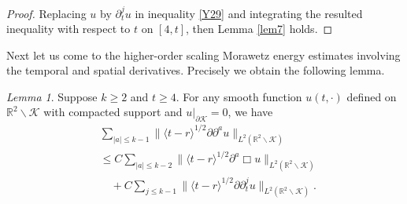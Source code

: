 \documentclass[11pt, reqno]{amsart}
\theoremstyle{definition}
\theoremstyle{remark}
\newtheorem{lem}[thm]{Lemma}
\theoremstyle{definition}
\numberwithin{equation}{section}
\numberwithin{equation}{section}
\def\leq{\leqslant}
\def\geq{\geqslant}
\begin{document}
\begin{proof}
Replacing $u$ by $\partial_t^ju$ in inequality \eqref{Y29} and
integrating the resulted inequality with respect to $t$ on $[4,t]$, then
 Lemma \ref{lem7} holds.
\end{proof}
Next let us come to the higher-order scaling Morawetz energy estimates
involving the temporal and spatial derivatives. Precisely we obtain
the following lemma.
\begin{lem}\label{lem8}
Suppose $k\geq2$ and $t\geq4$. For any smooth function $u(t,\cdot)$
defined on $\mathbb R^2\backslash\mathcal {K}$ with compacted
support and $u|_{\partial\mathcal {K}}=0$, we have
\begin{align}\label{Y23}
&\sum_{|a|\leq k-1}\|\langle
t-r\rangle^{1/2}\partial\partial^au\|_{L^2(\mathbb
R^2\backslash\mathcal {K})}\nonumber\\&\leq C\sum_{|a|\leq
k-2}\|\langle t-r\rangle^{1/2}\partial^a\Box u\|_{L^2(\mathbb
R^2\backslash\mathcal {K})}\nonumber\\&\quad+C\sum_{j\leq
k-1}\|\langle t-r\rangle^{1/2}\partial
\partial_t^ju\|_{L^2(\mathbb R^2\backslash\mathcal {K})}.
\end{align}
\end{lem}
\end{document}
